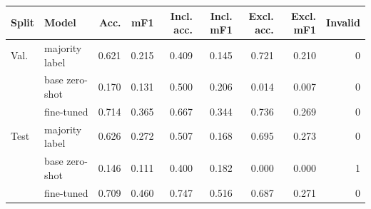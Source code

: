 \begin{tabular}{llrrrrrrr}\toprule
Split & Model & Acc. & mF1 & Incl. acc. & Incl. mF1 & Excl. acc. & Excl. mF1 & Invalid \\\midrule
Val. & majority label & 0.621 & 0.215 & 0.409 & 0.145 & 0.721 & 0.210 & 0 \\
& base zero-shot & 0.170 & 0.131 & 0.500 & 0.206 & 0.014 & 0.007 & 0 \\
& fine-tuned & 0.714 & 0.365 & 0.667 & 0.344 & 0.736 & 0.269 & 0 \\
\midrule
Test & majority label & 0.626 & 0.272 & 0.507 & 0.168 & 0.695 & 0.273 & 0 \\
& base zero-shot & 0.146 & 0.111 & 0.400 & 0.182 & 0.000 & 0.000 & 1 \\
& fine-tuned & 0.709 & 0.460 & 0.747 & 0.516 & 0.687 & 0.271 & 0 \\
\bottomrule\end{tabular}

